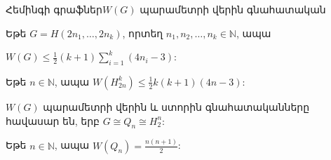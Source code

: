 \begin{frame}{Հեմինգի գրաֆներ}{$W(G)$ պարամետրի վերին գնահատական}

\begin{theorem}[2.6.5]
Եթե $G = H(2n_1,\ldots,2n_k)$, որտեղ $n_1, n_2, \ldots, n_k \in \mathbb{N}$, ապա
\begin{center}
$W(G) \leq \frac{1}{2}(k+1)\sum\limits_{i=1}^{k}{(4n_i-3)}$:
\end{center}
\end{theorem}

\begin{hide}
\begin{corollary}
\label{c2_Hamming_balanced_upper} Եթե $n \in \mathbb{N}$, ապա 
$W(H_{2n}^k) \leq \frac{1}{2}k(k+1)(4n-3)$:
\end{corollary}
\end{hide}

\pause

$W(G)$ պարամետրի վերին և ստորին գնահատականները հավասար են, երբ $G \cong Q_n \cong H_2^n$:

\begin{corollary}[2.6.7]
Եթե $n\in\mathbb{N}$, ապա $W\left(Q_{n}\right) = \frac{n(n+1)}{2}$:
\end{corollary}

\end{frame}
